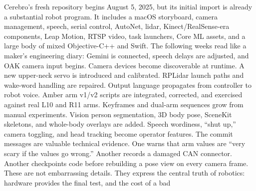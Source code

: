\markdownRendererSectionEnd \markdownRendererSectionBegin
{}\markdownRendererInterblockSeparator
{}Cerebro's fresh repository begins August 5, 2025, but its initial import is\markdownRendererSoftLineBreak
{}already a substantial robot program. It includes a macOS storyboard, camera\markdownRendererSoftLineBreak
{}management, speech, serial control, AutoNet, lidar, Kinect/RealSense-era\markdownRendererSoftLineBreak
{}components, Leap Motion, RTSP video, task launchers, Core ML assets, and a large\markdownRendererSoftLineBreak
{}body of mixed Objective-C++ and Swift.\markdownRendererParagraphSeparator
{}The following weeks read like a maker's engineering diary:\markdownRendererInterblockSeparator
{}\markdownRendererUlBegin
\markdownRendererUlItem Gemini is connected, speech delays are adjusted, and OAK camera input begins.\markdownRendererUlItemEnd 
\markdownRendererUlItem Camera devices become discoverable at runtime.\markdownRendererUlItemEnd 
\markdownRendererUlItem A new upper-neck servo is introduced and calibrated.\markdownRendererUlItemEnd 
\markdownRendererUlItem RPLidar launch paths and wake-word handling are repaired.\markdownRendererUlItemEnd 
\markdownRendererUlItem Output language propagates from controller to robot voice.\markdownRendererUlItemEnd 
\markdownRendererUlItem Amber arm v1/v2 scripts are integrated, corrected, and exercised against real\markdownRendererSoftLineBreak
{}L10 and R11 arms.\markdownRendererUlItemEnd 
\markdownRendererUlItem Keyframes and dual-arm sequences grow from manual experiments.\markdownRendererUlItemEnd 
\markdownRendererUlItem Vision person segmentation, 3D body pose, SceneKit skeletons, and whole-body\markdownRendererSoftLineBreak
{}overlays are added.\markdownRendererUlItemEnd 
\markdownRendererUlItem Speech wordiness, “shut up,” camera toggling, and head tracking become\markdownRendererSoftLineBreak
{}operator features.\markdownRendererUlItemEnd 
\markdownRendererUlEnd \markdownRendererInterblockSeparator
{}The commit messages are valuable technical evidence. One warns that arm values\markdownRendererSoftLineBreak
{}are “very scary if the values go wrong.” Another records a damaged CAN\markdownRendererSoftLineBreak
{}connector. Another checkpoints code before rebuilding a pose view on every\markdownRendererSoftLineBreak
{}camera frame. These are not embarrassing details. They express the central\markdownRendererSoftLineBreak
{}truth of robotics: hardware provides the final test, and the cost of a bad\markdownRendererSoftLineBreak
